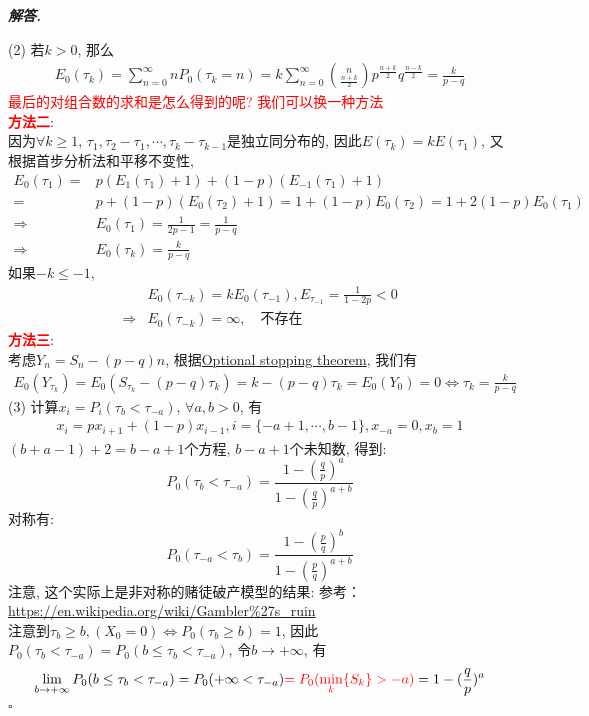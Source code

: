 \documentclass[10pt, a4paper, oneside]{ctexart}
\newenvironment{solution}{%
  \par\noindent\textbf{\textit{解答. }}\ignorespaces
}{%
  \hfill\ensuremath{\square}\par %
}
\begin{document}
\begin{solution}
(2) 若$k>0$, 那么 
\begin{align*}
    E_0(\tau_k)=\sum_{n=0}^{\infty} nP_0(\tau_k=n)=k\sum_{n=0}^{\infty} {n\choose \frac{n+k}{2}}p^{\frac{n+k}{2}}q^{\frac{n-k}{2}}=\frac{k}{p-q}
\end{align*}
\textcolor{red}{最后的对组合数的求和是怎么得到的呢? 我们可以换一种方法}\\
\textcolor{red}{\textbf{方法二}}: \\
因为$\forall k\geq 1$, $\tau_1,\tau_2-\tau_1,\cdots,\tau_k-\tau_{k-1}$是独立同分布的, 因此$E(\tau_k)=kE(\tau_1)$, 又根据首步分析法和平移不变性,
\begin{align*}
    E_0(\tau_1)=&p(E_1(\tau_1)+1)+(1-p)(E_{-1}(\tau_1)+1)\\
    =&p+(1-p)(E_0(\tau_2)+1)=1+(1-p)E_0(\tau_2)=1+2(1-p)E_0(\tau_1)\\
    \Rightarrow&E_0(\tau_1)=\frac{1}{2p-1}=\frac{1}{p-q}\\
    \Rightarrow&E_0(\tau_k)=\frac{k}{p-q}
\end{align*}
如果$-k\leq -1$, 
\begin{align*}
    &E_0(\tau_{-k})=kE_0(\tau_{-1}), E_{\tau_{-1}}=\frac{1}{1-2p}<0\\
    \Rightarrow& E_0(\tau_{-k})=\infty, \quad\text{不存在}
\end{align*}
\textcolor{red}{\textbf{方法三}}: \\
考虑$Y_n = S_n -(p-q)n$, 根据\href{https://en.wikipedia.org/wiki/Optional_stopping_theorem}{Optional stopping theorem}, 我们有
\begin{align*}
    E_0(Y_{\tau_k})=E_0(S_{\tau_k}-(p-q)\tau_k)=k-(p-q)\tau_k=E_0(Y_0)=0\iff \tau_k=\frac{k}{p-q}
\end{align*}
(3) 计算$x_i=P_i(\tau_{b}<\tau_{-a})$, $\forall a,b>0$, 有 
\begin{align*}
    x_i=px_{i+1}+(1-p)x_{i-1},i=\{-a+1,\cdots,b-1\},  x_{-a}=0, x_{b}=1
\end{align*}
$(b+a-1)+2=b-a+1$个方程, $b-a+1$个未知数, 得到:
$$P_0(\tau_{b}<\tau_{-a})=\frac{1-(\frac{q}{p})^a}{1-(\frac{q}{p})^{a+b}}$$
对称有:
$$P_0(\tau_{-a}<\tau_{b})=\frac{1-(\frac{p}{q})^b}{1-(\frac{p}{q})^{a+b}}$$
注意, 这个实际上是非对称的赌徒破产模型的结果: 参考：\url{https://en.wikipedia.org/wiki/Gambler%27s_ruin}\\
注意到$\tau_b\geq b, (X_0=0) \iff P_0(\tau_b\geq b)=1$, 因此$P_0(\tau_b<\tau_{-a})=P_0(b\leq \tau_b <\tau_{-a})$, 令$b\to +\infty$, 有
$$\lim_{b\to +\infty}P_0(b\leq \tau_b <\tau_{-a})=P_0(+\infty<\tau_{-a})\textcolor{red}{=P_0(\min_{k}\{S_k\}>-a)}=1-(\frac{q}{p})^a$$
\end{solution}
\end{document}
